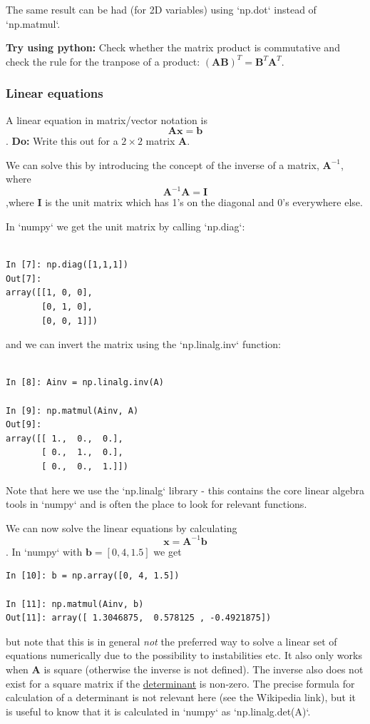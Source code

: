 \documentclass[a4paper,10pt]{article}
\begin{document}
The same result can be had (for 2D variables) using `np.dot` instead of `np.matmul`.

\textbf{Try using python:} Check whether the matrix product is commutative and check the rule for the tranpose of a product:
$(\mathbf{A}\mathbf{B})^T = \mathbf{B}^T\mathbf{A}^T$.


\subsubsection{ Linear equations}

A linear equation in matrix/vector notation is
$$\mathbf{A}\mathbf{x} = \mathbf{b}$$.
\textbf{Do:} Write this out for a $2\times 2$ matrix $\mathbf{A}$.

We can solve this by introducing the concept of the inverse of a matrix, $\mathbf{A}^{-1}$, where
$$\mathbf{A}^{-1} \mathbf{A} = \mathbf{I}$$,where $ \mathbf{I}$ is the unit matrix which has 1's on the diagonal and 0's everywhere else.

In `numpy` we get the unit matrix by calling `np.diag`:
\begin{lstlisting}

In [7]: np.diag([1,1,1])
Out[7]: 
array([[1, 0, 0],
       [0, 1, 0],
       [0, 0, 1]])
\end{lstlisting}
and we can invert the matrix using the `np.linalg.inv` function:
\begin{lstlisting}

In [8]: Ainv = np.linalg.inv(A)

In [9]: np.matmul(Ainv, A)
Out[9]: 
array([[ 1.,  0.,  0.],
       [ 0.,  1.,  0.],
       [ 0.,  0.,  1.]])
\end{lstlisting}
Note that here we use the `np.linalg` library - this contains the core linear algebra tools in `numpy` and is often the place to look for relevant functions.

We can now solve the linear equations by calculating
$$\mathbf{x} = \mathbf{A}^{-1} \mathbf{b}$$. In `numpy` with $\mathbf{b}=[0,  4, 1.5]$ we get

\begin{lstlisting}
In [10]: b = np.array([0, 4, 1.5])

In [11]: np.matmul(Ainv, b)
Out[11]: array([ 1.3046875,  0.578125 , -0.4921875])
\end{lstlisting}

but note that this is in general \textit{not} the preferred way to solve a linear set of equations numerically due to the possibility to instabilities etc. It also only works when $\mathbf{A}$ is square (otherwise the inverse is not defined). The inverse also does not exist for a square matrix if the \href{https://en.wikipedia.org/wiki/Determinant}{determinant} is non-zero. The precise formula for calculation of a determinant is not relevant here (see the Wikipedia link), but it is useful to know that it is calculated in `numpy` as `np.linalg.det(A)`. 
\end{document}
